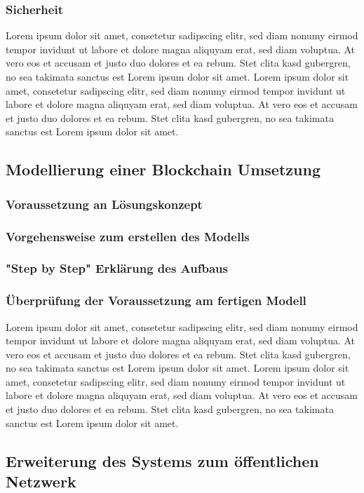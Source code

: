 \documentclass[a4paper, 10pt]{scrartcl}
\begin{document}
\subsubsection{Sicherheit}
Lorem ipsum dolor sit amet, consetetur sadipscing elitr, sed diam nonumy eirmod tempor invidunt ut labore et dolore magna aliquyam erat, sed diam voluptua. At vero eos et accusam et justo duo dolores et ea rebum. Stet clita kasd gubergren, no sea takimata sanctus est Lorem ipsum dolor sit amet. Lorem ipsum dolor sit amet, consetetur sadipscing elitr, sed diam nonumy eirmod tempor invidunt ut labore et dolore magna aliquyam erat, sed diam voluptua. At vero eos et accusam et justo duo dolores et ea rebum. Stet clita kasd gubergren, no sea takimata sanctus est Lorem ipsum dolor sit amet.
\subsection{Modellierung einer Blockchain Umsetzung}
\subsubsection{Voraussetzung an Lösungskonzept}
\subsubsection{Vorgehensweise zum erstellen des Modells}
\subsubsection{"Step by Step" Erklärung des Aufbaus}
\subsubsection{Überprüfung der Voraussetzung am fertigen Modell}
Lorem ipsum dolor sit amet, consetetur sadipscing elitr, sed diam nonumy eirmod tempor invidunt ut labore et dolore magna aliquyam erat, sed diam voluptua. At vero eos et accusam et justo duo dolores et ea rebum. Stet clita kasd gubergren, no sea takimata sanctus est Lorem ipsum dolor sit amet. Lorem ipsum dolor sit amet, consetetur sadipscing elitr, sed diam nonumy eirmod tempor invidunt ut labore et dolore magna aliquyam erat, sed diam voluptua. At vero eos et accusam et justo duo dolores et ea rebum. Stet clita kasd gubergren, no sea takimata sanctus est Lorem ipsum dolor sit amet.
\subsection{Erweiterung des Systems zum öffentlichen Netzwerk}
\end{document}
